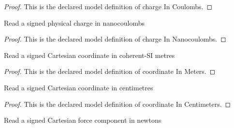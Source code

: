 \begin{proof}
  This is the declared model definition of charge In Coulombs.
\end{proof}
\begin{definition}
  \label{def:physics:phyx-mini-0899:phyxminiproblems-problemphyxmini0899-chargeinnanocoulombs}
  Read a signed physical charge in nanocoulombs
\end{definition}
\begin{proof}
  This is the declared model definition of charge In Nanocoulombs.
\end{proof}
\begin{definition}
  \label{def:physics:phyx-mini-0899:phyxminiproblems-problemphyxmini0899-coordinateinmeters}
  Read a signed Cartesian coordinate in coherent-SI metres
\end{definition}
\begin{proof}
  This is the declared model definition of coordinate In Meters.
\end{proof}
\begin{definition}
  \label{def:physics:phyx-mini-0899:phyxminiproblems-problemphyxmini0899-coordinateincentimeters}
  Read a signed Cartesian coordinate in centimetres
\end{definition}
\begin{proof}
  This is the declared model definition of coordinate In Centimeters.
\end{proof}
\begin{definition}
  \label{def:physics:phyx-mini-0899:phyxminiproblems-problemphyxmini0899-forcecomponentinnewtons}
  Read a signed Cartesian force component in newtons
\end{definition}
